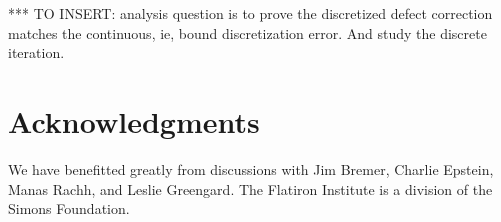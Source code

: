 \documentclass[10pt]{article}
\begin{document}
*** TO INSERT: analysis question is to prove the discretized
defect correction matches the continuous, ie, bound discretization error.
And study the discrete iteration.


\section*{Acknowledgments}
We have benefitted greatly from discussions with Jim Bremer, Charlie Epstein,
Manas Rachh, and Leslie Greengard.
The Flatiron Institute is a division of the Simons Foundation.













\end{document}
